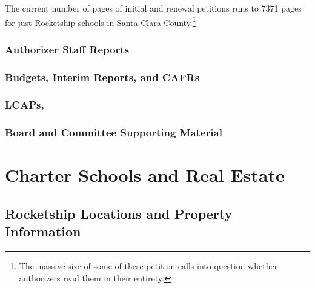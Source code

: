 The current number of pages of initial and renewal petitions runs to 7371 pages for just Rocketship schools in Santa Clara County.\footnote{The massive size of some of these petition calls into question whether authorizers read them in their entirety.}

\subsubsection{Authorizer Staff Reports}\label{sec:findings-authorizer-staff-reports}\indent

\subsubsection{Budgets, Interim Reports, and CAFRs}\label{sec:findings-budgets-etc}\indent

\subsubsection{LCAPs,}\label{sec:findings-lcaps}\indent

\subsubsection{Board and Committee Supporting Material}\label{sec:findings-board-material}\indent

\section{Charter Schools and Real Estate}\label{sec:findings-charter-real-estate}\indent

\subsection{Rocketship Locations and Property Information}\label{sec:location-and-property-info}\indent

